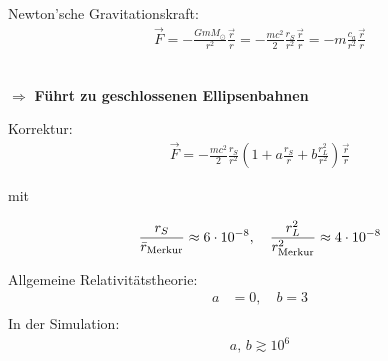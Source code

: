 \documentclass[a4paper, 14pt, fleqn, notitlepage]{scrartcl}
\newcommand{\unitr}{\frac{\vec{r}}{r}}
\begin{document}
\noindent
\begin{minipage}[t]{0.6\paperwidth}
  Newton'sche Gravitationskraft:
  \begin{align*}
    \vec{F} = - \frac{G m M_\odot}{r^2} \unitr = - \frac{mc^2}{2} \frac{r_S}{r^2} \unitr= - m \frac{c_a}{r^2} \unitr
  \end{align*}\\[0.5em]
  
  \vspace{-1.3cm}
  
  $\Longrightarrow$ {\bf F\"uhrt zu geschlossenen Ellipsenbahnen}
    
  \vspace{0.5cm}
  
  Korrektur:
  \begin{align*}
    \vec{F} = - \frac{mc^2}{2} \frac{r_S}{r^2} \left(1 + a \frac{r_S}{r} + b \frac{r_L^2}{r^2}\right) \unitr
  \end{align*}
  
  mit
  
  \vspace{-1cm}
  
  $$
    \frac{r_S}{\bar r_{\rm Merkur}} \approx 6 \cdot 10^{-8}, \quad \frac{r_L^2}{r_{\rm Merkur}^2} \approx 4 \cdot 10^{-8}
$$
  
  
\end{minipage}
\begin{minipage}[t]{0.5\paperwidth}
  Allgemeine Relativit\"atstheorie:
  \begin{align*}
    a &= 0, \quad b = 3\\[1.em]
    \end{align*}
  In der Simulation:
  \begin{align*}
    a,\, b \gtrsim 10^{6}
  \end{align*}
\end{minipage}
\end{document}
